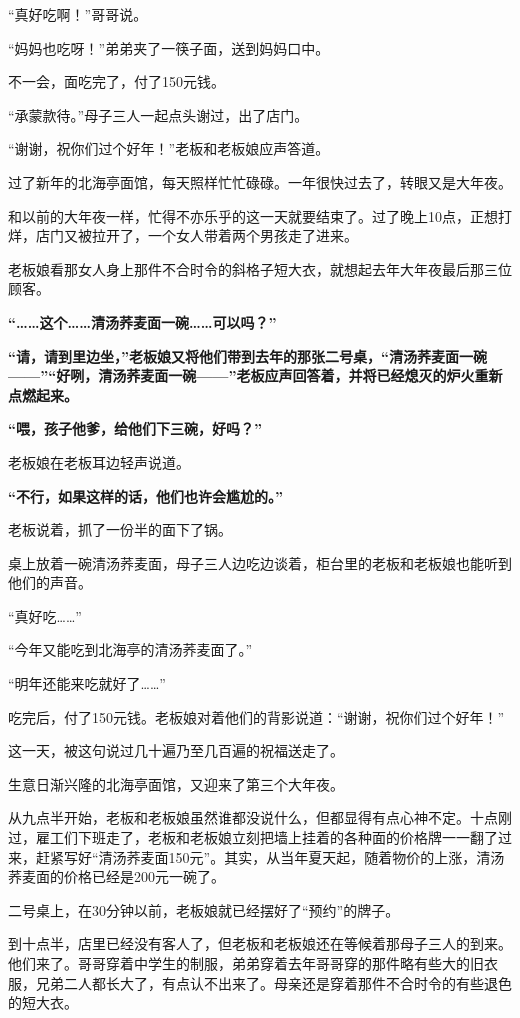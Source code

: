\documentclass[UTF8,a4paper,8pt]{ctexart}
\begin{document}
 “真好吃啊！”哥哥说。
 
 “妈妈也吃呀！”弟弟夹了一筷子面，送到妈妈口中。
 
 不一会，面吃完了，付了150元钱。
 
 “承蒙款待。”母子三人一起点头谢过，出了店门。
 
 “谢谢，祝你们过个好年！”老板和老板娘应声答道。
 
 过了新年的北海亭面馆，每天照样忙忙碌碌。一年很快过去了，转眼又是大年夜。
 
 和以前的大年夜一样，忙得不亦乐乎的这一天就要结束了。过了晚上10点，正想打烊，店门又被拉开了，一个女人带着两个男孩走了进来。
 
 老板娘看那女人身上那件不合时令的斜格子短大衣，就想起去年大年夜最后那三位顾客。
 
 \textbf{  “……这个……清汤荞麦面一碗……可以吗？”}
 
 \textbf{ “请，请到里边坐，”老板娘又将他们带到去年的那张二号桌，“清汤荞麦面一碗——”“好咧，清汤荞麦面一碗——”老板应声回答着，并将已经熄灭的炉火重新点燃起来。}
 
 \textbf{“喂，孩子他爹，给他们下三碗，好吗？”}
 
 老板娘在老板耳边轻声说道。
 
 \textbf{  “不行，如果这样的话，他们也许会尴尬的。”}
 
 老板说着，抓了一份半的面下了锅。
 
 桌上放着一碗清汤荞麦面，母子三人边吃边谈着，柜台里的老板和老板娘也能听到他们的声音。
 
 “真好吃……”
 
 “今年又能吃到北海亭的清汤荞麦面了。”
 
 “明年还能来吃就好了……”
 
 吃完后，付了150元钱。老板娘对着他们的背影说道：“谢谢，祝你们过个好年！”
 
 这一天，被这句说过几十遍乃至几百遍的祝福送走了。
 
 生意日渐兴隆的北海亭面馆，又迎来了第三个大年夜。
 
 从九点半开始，老板和老板娘虽然谁都没说什么，但都显得有点心神不定。十点刚过，雇工们下班走了，老板和老板娘立刻把墙上挂着的各种面的价格牌一一翻了过来，赶紧写好“清汤荞麦面150元”。其实，从当年夏天起，随着物价的上涨，清汤荞麦面的价格已经是200元一碗了。
 
 二号桌上，在30分钟以前，老板娘就已经摆好了“预约”的牌子。
 
 到十点半，店里已经没有客人了，但老板和老板娘还在等候着那母子三人的到来。他们来了。哥哥穿着中学生的制服，弟弟穿着去年哥哥穿的那件略有些大的旧衣服，兄弟二人都长大了，有点认不出来了。母亲还是穿着那件不合时令的有些退色的短大衣。
 
\end{document}
